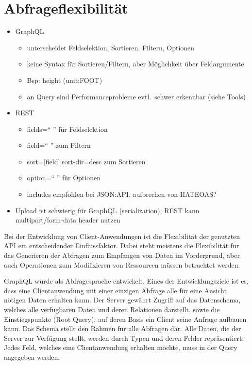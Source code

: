 \section{Abfrageflexibilität}
\begin{itemize}
  \item GraphQL
  \begin{itemize}
    \item unterscheidet Feldselektion, Sortieren, Filtern, Optionen
    \item keine Syntax für Sortieren/Filtern, aber Möglichkeit über Feldargumente
    \item Bsp: height (unit:FOOT)
    \item an Query sind Performanceprobleme evtl.\ schwer erkennbar (siehe Tools)
  \end{itemize}
  \item REST
  \begin{itemize}
    \item fields=`` '' für Feldselektion
    \item field=`` '' zum Filtern
    \item sort=[field],sort-dir=desc zum Sortieren
    \item option=`` '' für Optionen
    \item includes empfohlen bei JSON:API, aufbrechen von HATEOAS\@?
  \end{itemize}
  \item Upload ist schwierig für GraphQL (serialization), REST kann multipart/form-data header nutzen
\end{itemize}
Bei der Entwicklung von Client-Anwendungen ist die Flexibilität der genutzten API ein entscheidender Einflussfaktor.
Dabei steht meistens die Flexibilität für das Generieren der Abfragen zum Empfangen von Daten im Vordergrund, aber auch Operationen zum Modifizieren von Ressourcen müssen betrachtet werden.
\par
GraphQL wurde als Abfragesprache entwickelt.
Eines der Entwicklungsziele ist es, dass eine Clientanwendung mit einer einzigen Abfrage alle für eine Ansicht nötigen Daten erhalten kann.
Der Server gewährt Zugriff auf das Datenschema, welches alle verfügbaren Daten und deren Relationen darstellt, sowie die Einstiegspunkte (Root Query), auf deren Basis ein Client seine Anfrage aufbauen kann.
Das Schema stellt den Rahmen für alle Abfragen dar.
Alle Daten, die der Server zur Verfügung stellt, werden durch Typen und deren Felder repräsentiert.
Jedes Feld, welches eine Clientanwendung erhalten möchte, muss in der Query angegeben werden.
